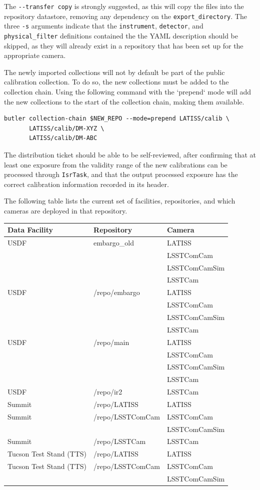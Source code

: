 \documentclass[DM,authoryear,toc]{lsstdoc}
\begin{document}
The \verb|--transfer copy| is strongly suggested, as this will copy the files into the repository datastore, removing any dependency on the \verb|export_directory|.
The three \verb|-s| arguments indicate that the \verb|instrument|, \verb|detector|, and \verb|physical_filter| definitions contained the the YAML description should be skipped, as they will already exist in a repository that has been set up for the appropriate camera.

The newly imported collections will not by default be part of the public calibration collection.
To do so, the new collections must be added to the collection chain.
Using the following command with the `prepend` mode will add the new collections to the start of the collection chain, making them available.
\begin{verbatim}
butler collection-chain $NEW_REPO --mode=prepend LATISS/calib \
       LATISS/calib/DM-XYZ \
       LATISS/calib/DM-ABC
\end{verbatim}
The distribution ticket should be able to be self-reviewed, after confirming that at least one exposure from the validity range of the new calibrations can be processed through \verb|IsrTask|, and that the output processed exposure has the correct calibration information recorded in its header.

The following table lists the current set of facilities, repositories, and which cameras are deployed in that repository.

\begin{tabular}{lll}
  Data Facility & Repository & Camera \\
  \hline
  USDF & embargo\_old & LATISS \\
  & & LSSTComCam \\
  & & LSSTComCamSim \\
  & & LSSTCam \\
  \hline
  USDF & /repo/embargo & LATISS \\
  & & LSSTComCam \\
  & & LSSTComCamSim \\
  & & LSSTCam \\
  \hline
  USDF & /repo/main & LATISS \\
  & & LSSTComCam \\
  & & LSSTComCamSim \\
  & & LSSTCam \\
  \hline
  USDF & /repo/ir2 & LSSTCam \\
  \hline
  Summit & /repo/LATISS & LATISS \\
  Summit & /repo/LSSTComCam & LSSTComCam \\
  & & LSSTComCamSim \\
  Summit & /repo/LSSTCam & LSSTCam \\
  \hline
  Tucson Test Stand (TTS) & /repo/LATISS & LATISS \\
  Tucson Test Stand (TTS) & /repo/LSSTComCam & LSSTComCam \\
  & & LSSTComCamSim \\
  \hline
\end{tabular}
\end{document}
